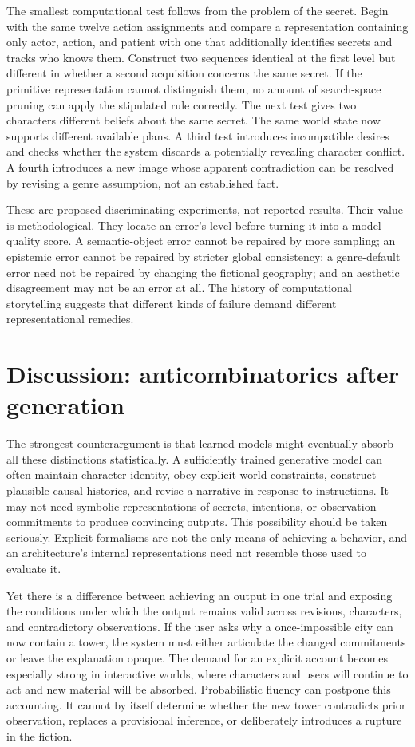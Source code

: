 \documentclass[
  11pt,
  letterpaper,
]{article}
\begin{document}
The smallest computational test follows from the problem of the secret.
Begin with the same twelve action assignments and compare a
representation containing only actor, action, and patient with one that
additionally identifies secrets and tracks who knows them. Construct two
sequences identical at the first level but different in whether a second
acquisition concerns the same secret. If the primitive representation
cannot distinguish them, no amount of search-space pruning can apply the
stipulated rule correctly. The next test gives two characters different
beliefs about the same secret. The same world state now supports
different available plans. A third test introduces incompatible desires
and checks whether the system discards a potentially revealing character
conflict. A fourth introduces a new image whose apparent contradiction
can be resolved by revising a genre assumption, not an established fact.

These are proposed discriminating experiments, not reported results.
Their value is methodological. They locate an error's level before
turning it into a model-quality score. A semantic-object error cannot be
repaired by more sampling; an epistemic error cannot be repaired by
stricter global consistency; a genre-default error need not be repaired
by changing the fictional geography; and an aesthetic disagreement may
not be an error at all. The history of computational storytelling
suggests that different kinds of failure demand different
representational remedies.

\section{Discussion: anticombinatorics after
generation}\label{discussion-anticombinatorics-after-generation}

The strongest counterargument is that learned models might eventually
absorb all these distinctions statistically. A sufficiently trained
generative model can often maintain character identity, obey explicit
world constraints, construct plausible causal histories, and revise a
narrative in response to instructions. It may not need symbolic
representations of secrets, intentions, or observation commitments to
produce convincing outputs. This possibility should be taken seriously.
Explicit formalisms are not the only means of achieving a behavior, and
an architecture's internal representations need not resemble those used
to evaluate it.

Yet there is a difference between achieving an output in one trial and
exposing the conditions under which the output remains valid across
revisions, characters, and contradictory observations. If the user asks
why a once-impossible city can now contain a tower, the system must
either articulate the changed commitments or leave the explanation
opaque. The demand for an explicit account becomes especially strong in
interactive worlds, where characters and users will continue to act and
new material will be absorbed. Probabilistic fluency can postpone this
accounting. It cannot by itself determine whether the new tower
contradicts prior observation, replaces a provisional inference, or
deliberately introduces a rupture in the fiction.
\end{document}
